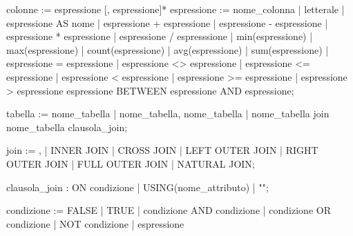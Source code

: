 \documentclass[
]{article}
\newenvironment{Shaded}{}{}
\newcommand{\NormalTok}[1]{#1}
\begin{document}
\begin{Shaded}
\begin{Highlighting}[]
\NormalTok{colonne := espressione [, espressione]*}
\NormalTok{espressione := nome\_colonna |}
\NormalTok{               letterale |}
\NormalTok{               espressione AS nome |}
\NormalTok{               espressione + espressione |}
\NormalTok{               espressione {-} espressione |}
\NormalTok{               espressione * espressione |}
\NormalTok{               espressione / espresssione |}
\NormalTok{               min(espressione) |}
\NormalTok{               max(espressione) |}
\NormalTok{               count(espressione) |}
\NormalTok{               avg(espressione) |}
\NormalTok{               sum(espressione) |}
\NormalTok{               espressione = espressione |}
\NormalTok{               espressione \textless{}\textgreater{} espressione |}
\NormalTok{               espressione \textless{}= espressione |}
\NormalTok{               espressione \textless{} espressione |}
\NormalTok{               espressione \textgreater{}= espressione |}
\NormalTok{               espressione \textgreater{} espressione}
\NormalTok{               espressione BETWEEN espressione AND espressione;}

\NormalTok{tabella := nome\_tabella |}
\NormalTok{           nome\_tabella, nome\_tabella |}
\NormalTok{           nome\_tabella join nome\_tabella clausola\_join;}

\NormalTok{join := , |}
\NormalTok{        INNER JOIN |}
\NormalTok{        CROSS JOIN |}
\NormalTok{        LEFT OUTER JOIN |}
\NormalTok{        RIGHT OUTER JOIN |}
\NormalTok{        FULL OUTER JOIN |}
\NormalTok{        NATURAL JOIN;}

\NormalTok{clausola\_join : ON condizione |}
\NormalTok{                USING(nome\_attributo) |}
\NormalTok{                "";}

\NormalTok{condizione := FALSE | TRUE |}
\NormalTok{              condizione AND condizione |}
\NormalTok{              condizione OR condizione |}
\NormalTok{              NOT condizione |}
\NormalTok{              espressione}
\end{Highlighting}
\end{Shaded}
\end{document}
